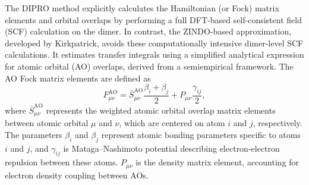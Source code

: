 The DIPRO method explicitly calculates the Hamiltonian (or Fock) matrix elements and orbital overlaps by performing a full DFT-based self-consistent field (SCF) calculation on the dimer. 
In contrast, the ZINDO-based approximation, developed by Kirkpatrick, avoids these computationally intensive dimer-level SCF calculations. 
It estimates transfer integrals using a simplified analytical expression for atomic orbital (AO) overlaps, derived from a semiempirical framework.
The AO Fock matrix elements are defined as 
\begin{equation} \label{equ:2.106}
F^{\text{AO}}_{\mu\nu} = 
\bar{S}^{\text{AO}}_{\mu\nu}\frac{\beta_{i} + \beta_{j}}{2} + P_{\mu\nu}\frac{\gamma_{ij}}{2},
\end{equation}
where $\bar{S}^{\text{AO}}_{\mu\nu}$ represents the weighted atomic orbital overlap matrix elements between atomic orbital $\mu$ and $\nu$, which are centered on atom $i$ and $j$, respectively.
The parameters $\beta_{i}$ and $\beta_{j}$ represent atomic bonding parameters specific to atoms $i$ and $j$, and $\gamma_{ij}$ is Mataga–Nashimoto potential describing electron-electron repulsion between these atoms.
$P_{\mu\nu}$ is the density matrix element, accounting for electron density coupling between AOs.

